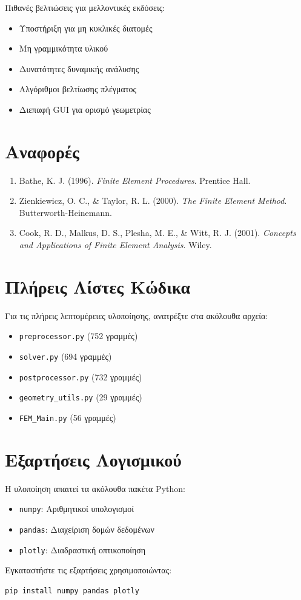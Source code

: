 \documentclass[12pt,a4paper]{article}
\begin{document}
Πιθανές βελτιώσεις για μελλοντικές εκδόσεις:
\begin{itemize}
    \item Υποστήριξη για μη κυκλικές διατομές
    \item Μη γραμμικότητα υλικού
    \item Δυνατότητες δυναμικής ανάλυσης
    \item Αλγόριθμοι βελτίωσης πλέγματος
    \item Διεπαφή GUI για ορισμό γεωμετρίας
\end{itemize}

\section{Αναφορές}

\begin{enumerate}
    \item Bathe, K. J. (1996). \textit{Finite Element Procedures}. Prentice Hall.
    \item Zienkiewicz, O. C., \& Taylor, R. L. (2000). \textit{The Finite Element Method}. Butterworth-Heinemann.
    \item Cook, R. D., Malkus, D. S., Plesha, M. E., \& Witt, R. J. (2001). \textit{Concepts and Applications of Finite Element Analysis}. Wiley.
\end{enumerate}

\appendix

\section{Πλήρεις Λίστες Κώδικα}

Για τις πλήρεις λεπτομέρειες υλοποίησης, ανατρέξτε στα ακόλουθα αρχεία:
\begin{itemize}
    \item \texttt{preprocessor.py} (752 γραμμές)
    \item \texttt{solver.py} (694 γραμμές)
    \item \texttt{postprocessor.py} (732 γραμμές)
    \item \texttt{geometry\_utils.py} (29 γραμμές)
    \item \texttt{FEM\_Main.py} (56 γραμμές)
\end{itemize}

\section{Εξαρτήσεις Λογισμικού}

Η υλοποίηση απαιτεί τα ακόλουθα πακέτα Python:
\begin{itemize}
    \item \texttt{numpy}: Αριθμητικοί υπολογισμοί
    \item \texttt{pandas}: Διαχείριση δομών δεδομένων
    \item \texttt{plotly}: Διαδραστική οπτικοποίηση
\end{itemize}

Εγκαταστήστε τις εξαρτήσεις χρησιμοποιώντας:
\begin{verbatim}
pip install numpy pandas plotly
\end{verbatim}
\end{document}
